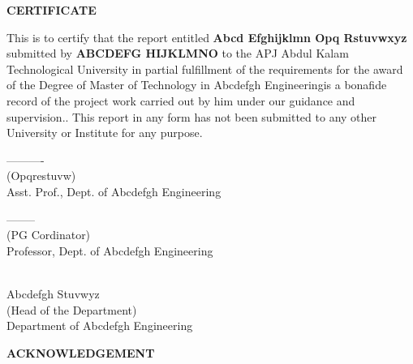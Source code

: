 \documentclass[12pt,a4paper]{report}
\def \reptitle{Abcd Efghijklmn Opq Rstuvwxyz}
\def \repauthor{ABCDEFG HIJKLMNO}
\def \repbranch{Abcdefgh Engineering}
\def \repsupervisor{Opqrestuvw}
\begin{document}
\center\textbf{\Large CERTIFICATE}

\justify
This is to certify that the report entitled \textbf{\large \reptitle} submitted by \textbf{\repauthor} to the APJ Abdul Kalam Technological University in partial fulfillment of the requirements for the award of the Degree of Master of Technology in \repbranch  is a bonafide record of the project work carried out by him under our guidance and supervision.. This report in any form has not been submitted to any other University or Institute for any purpose.

\vfill  %
\noindent
\parbox[b]{0.4\linewidth}{%
    \strut
    \centering  
    ----------\\
    (\repsupervisor) \\
    Asst. Prof., Dept. of 
    \repbranch } 
\hspace{2.5cm} %
\parbox[b]{0.4\linewidth}{%
    \strut
    \centering 
    -------- \\[0cm]%
    (PG Cordinator) \\
    Professor, Dept. of 
    \repbranch } 
    \par\vspace{0cm}
    


\vspace{0.5cm}
\begin{center}
\parbox[b]{0.4\linewidth}{%
    \strut
    \centering 
    \\[2cm]
    Abcdefgh Stuvwyz \\[0cm]%
    (Head of the Department) \\
    Department of \repbranch } 
    \par\vspace{0cm}
\end{center}
\newpage

{\centering \textbf{\Large ACKNOWLEDGEMENT} \par }

\end{document}
